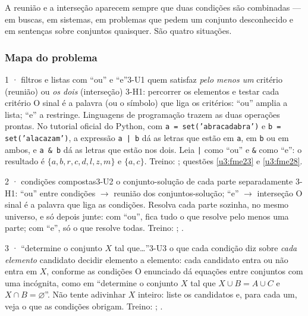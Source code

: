 \OndeEUsado

A reunião e a interseção aparecem sempre que duas condições são combinadas — em buscas, em sistemas, em problemas que pedem um conjunto desconhecido e em sentenças sobre conjuntos quaisquer. São quatro situações.

\subsubsection{Mapa do problema}

\begin{caso}{1 · filtros e listas com \enquote{ou} e \enquote{e}}{3-U1}
{quem satisfaz \emph{pelo menos um} critério (reunião) ou \emph{os dois} (interseção)}
{3-H1: percorrer os elementos e testar cada critério}
\reconhecer O sinal é a palavra (ou o símbolo) que liga os critérios: \enquote{ou} amplia a lista; \enquote{e} a restringe. Linguagens de programação trazem as duas operações prontas. No tutorial oficial do Python, com \texttt{a = set('abracadabra')} e \texttt{b = set('alacazam')}, a expressão \texttt{a | b} dá as letras que estão em \texttt{a}, em \texttt{b} ou em ambos, e \texttt{a \& b} dá as letras que estão nos dois. Leia \texttt{|} como \enquote{ou} e \texttt{\&} como \enquote{e}: o resultado é $\{a,b,r,c,d,l,z,m\}$ e $\{a,c\}$. Treino: ; questões \ref{u3:fme23} e \ref{u3:fme28}.
\end{caso}

\begin{caso}{2 · condições compostas}{3-U2}
{o conjunto-solução de cada parte separadamente}
{3-H1: \enquote{ou} entre condições $\to$ reunião dos conjuntos-solução; \enquote{e} $\to$ interseção}
\reconhecer O sinal é a palavra que liga as condições. Resolva cada parte sozinha, no mesmo universo, e só depois junte: com \enquote{ou}, fica tudo o que resolve pelo menos uma parte; com \enquote{e}, só o que resolve todas. Treino: ; .
\end{caso}

\begin{caso}{3 · \enquote{determine o conjunto $X$ tal que\ldots}}{3-U3}
{o que cada condição diz sobre \emph{cada elemento} candidato}
{decidir elemento a elemento: cada candidato entra ou não entra em $X$, conforme as condições}
\reconhecer O enunciado dá equações entre conjuntos com uma incógnita, como em \enquote{determine o conjunto $X$ tal que $X\cup B=A\cup C$ e $X\cap B=\varnothing$}. Não tente adivinhar $X$ inteiro: liste os candidatos e, para cada um, veja o que as condições obrigam. Treino: ; .
\end{caso}

